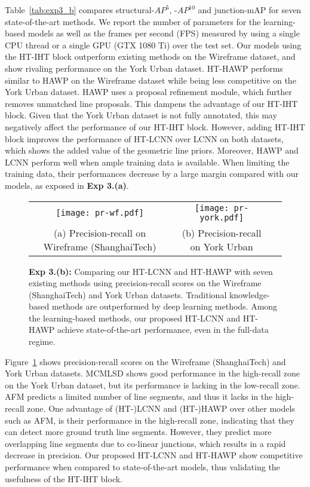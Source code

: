 \documentclass[runningheads]{llncs}
\newcommand{\model}{HT-IHT block\xspace}
\begin{document}
Table~\ref{tab:exp3_b} compares structural-$AP^5$, -$AP^{10}$ and junction-mAP for seven state-of-the-art methods.
We report the number of parameters for the learning-based models as well as the frames per second (FPS) measured by using a single CPU thread or a single GPU (GTX 1080 Ti) over the test set.
Our models using the \model outperform existing methods on the Wireframe dataset, and show rivaling performance on the York Urban dataset.
HT-HAWP performs similar to HAWP on the Wireframe dataset while being less competitive on the York Urban dataset. 
HAWP uses a proposal refinement module, which further removes unmatched line proposals. 
This dampens the advantage of our \model.
Given that the York Urban dataset is not fully annotated, this may negatively affect the performance of our \model.
However, adding \model improves the performance of HT-LCNN over LCNN on both datasets, which shows the added value of the geometric line priors. 
Moreover, HAWP and LCNN perform well when ample training data is available. 
When limiting the training data, their performances decrease by a large margin compared with our models, as exposed in \textbf{Exp 3.(a)}.

\begin{figure}[t!]
    \centering
    \begin{tabular}{ccc}
        \texttt{[image: pr-wf.pdf]} &
        \texttt{[image: pr-york.pdf]} \\
        \scriptsize{(a) Precision-recall on Wireframe (ShanghaiTech)} & 
        \scriptsize{(b) Precision-recall on York Urban}\\
    \end{tabular}
    \caption{\textbf{Exp 3.(b):} 
    Comparing our HT-LCNN and HT-HAWP with seven existing methods using precision-recall scores on the Wireframe (ShanghaiTech) and York Urban datasets.
    Traditional knowledge-based methods are outperformed by deep learning methods.
    Among the learning-based methods, our proposed HT-LCNN and HT-HAWP achieve state-of-the-art performance, even in the full-data regime.}
    \label{fig:exp3_b}
\end{figure}

Figure~\ref{fig:exp3_b} shows precision-recall scores \cite{almazan2017mcmlsd} on the Wireframe (ShanghaiTech) and York Urban datasets.
MCMLSD \cite{almazan2017mcmlsd} shows good performance in the high-recall zone on the York Urban dataset, but its performance is lacking in the low-recall zone. 
AFM \cite{xue2019learning} predicts a limited number of line segments, and thus it lacks in the high-recall zone. 
One advantage of (HT-)LCNN and (HT-)HAWP over other models such as AFM, is their performance in the high-recall zone, indicating that they can detect more ground truth line segments. 
However, they predict more overlapping line segments due to co-linear junctions, which results in a rapid decrease in precision. 
Our proposed HT-LCNN and HT-HAWP show competitive performance when compared to state-of-the-art models, thus validating the usefulness of the \model. 
\end{document}
